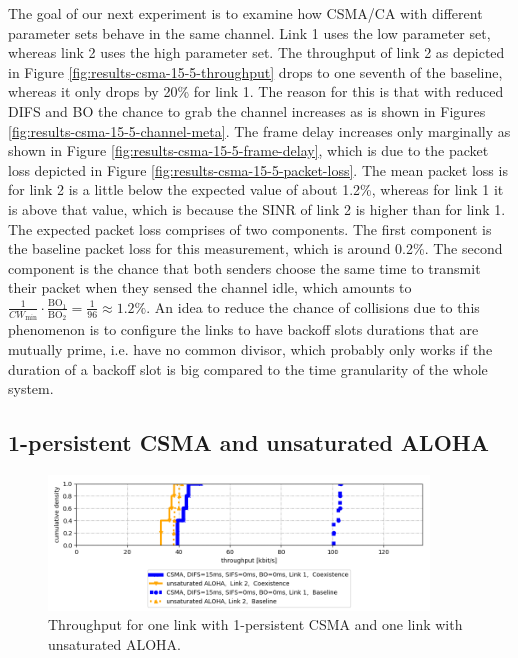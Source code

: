 The goal of our next experiment is to examine how CSMA/CA with different parameter sets behave in the same channel. Link 1 uses the low parameter set, whereas link 2 uses the high parameter set. The throughput of link 2 as depicted in Figure \ref{fig:results-csma-15-5-throughput} drops to one seventh of the baseline, whereas it only drops by 20\% for link 1. The reason for this is that with reduced DIFS and BO the chance to grab the channel increases as is shown in Figures \ref{fig:results-csma-15-5-channel-meta}. The frame delay increases only marginally as shown in Figure \ref{fig:results-csma-15-5-frame-delay}, which is due to the packet loss depicted in Figure \ref{fig:results-csma-15-5-packet-loss}. The mean packet loss is for link 2 is a little below the expected value of about 1.2\%, whereas for link 1 it is above that value, which is because the SINR of link 2 is higher than for link 1. The expected packet loss comprises of two components. The first component is the baseline packet loss for this measurement, which is around 0.2\%. The second component is the chance that both senders choose the same time to transmit their packet when they sensed the channel idle, which amounts to $ \frac{1}{CW_\text{min}} \cdot \frac{\text{BO}_1}{\text{BO}_2} = \frac{1}{96} \approx 1.2\% $. An idea to reduce the chance of collisions due to this phenomenon is to configure the links to have backoff slots durations that are mutually prime, i.e. have no common divisor, which probably only works if the duration of a backoff slot is big compared to the time granularity of the whole system. 

\subsection{1-persistent CSMA and unsaturated ALOHA}

\begin{figure}[tb]
	\label{fig:results-difs-only-aloha-throughput}
	\begin{center}
		\includegraphics[width=0.9\textwidth]{pictures/results/different_combinations/difs_only_aloha/throughput_cdf}
	\end{center}
	\caption{Throughput for one link with 1-persistent CSMA and one link with unsaturated ALOHA.}
\end{figure}

